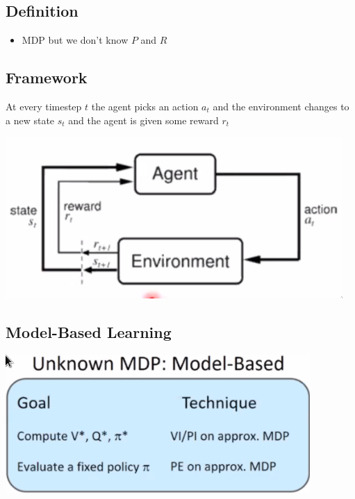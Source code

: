 \documentclass[11pt]{article}
\begin{document}
\subsection{Definition}
\label{sec:org22d7c5c}
\begin{itemize}
\item MDP but we don't know \(P\) and \(R\)
\end{itemize}
\subsection{Framework}
\label{sec:org853db48}
At every timestep \(t\) the agent picks an action \(a_t\) and the environment changes to a new state \(s_t\) and the agent is given some reward \(r_t\)
\begin{center}
\includegraphics[width=.9\linewidth]{images/2020-09-15_17-13-25_screenshot.png}
\end{center}
\subsection{Model-Based Learning}
\label{sec:orgbe48dbd}
\begin{center}
\includegraphics[width=.9\linewidth]{images/2020-09-17_17-13-20_screenshot.png}
\end{center}
\end{document}

